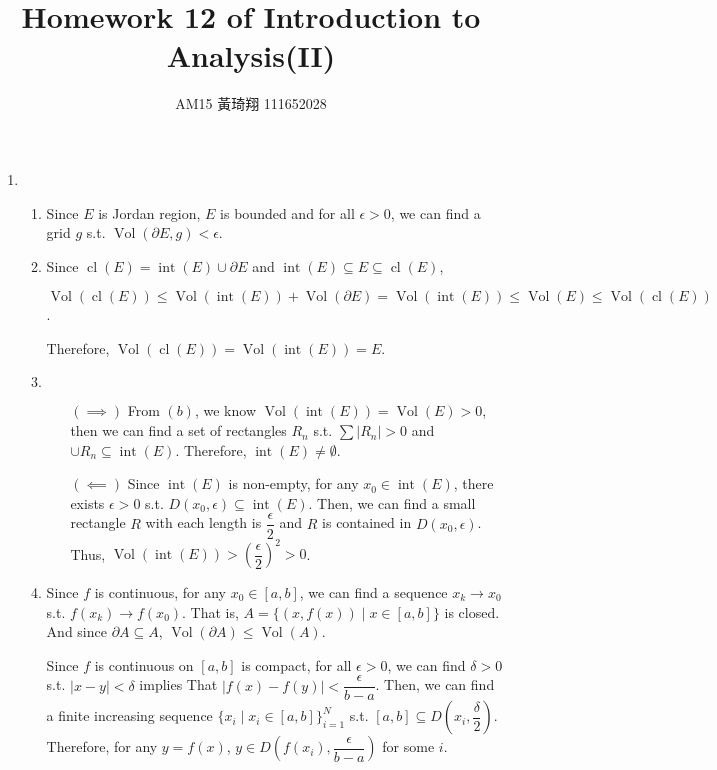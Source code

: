 \documentclass[12pt]{article}
\title{Homework 12 of Introduction to Analysis(II)}
\author{AM15 黃琦翔 111652028}
\DeclareMathOperator{\volume}{Vol}
\DeclareMathOperator{\interior}{int}
\DeclareMathOperator{\closure}{cl}
\newcommand{\boundary}{\partial}
\begin{document}
\maketitle
\begin{enumerate}
    \item \begin{enumerate}
        \item Since $E$ is Jordan region, $E$ is bounded and for all $\epsilon > 0$, we can find a grid $g$ s.t. $\volume(\partial E, g) < \epsilon$.
        

        \item Since $\closure(E) = \interior(E) \cup \boundary E$ and $\interior(E)\subseteq E \subseteq \closure(E)$,

        $\volume(\closure(E)) \leq \volume(\interior(E)) + \volume(\boundary E) = \volume(\interior(E))\leq \volume(E) \leq \volume(\closure(E))$.

        Therefore, $\volume(\closure(E)) = \volume(\interior(E)) = E$.

        \item $\ $
        \begin{enumerate}
            \item[$(\implies)$] From $(b)$, we know $\volume(\interior(E)) = \volume(E) > 0$, 
            then we can find a set of rectangles $R_n$ s.t. $\sum |R_n| > 0$ and $\cup R_n \subseteq \interior(E)$.
            Therefore, $\interior(E) \neq \emptyset$.

            \item[$(\impliedby)$] Since $\interior(E)$ is non-empty, for any $x_0\in \interior(E)$, there exists $\epsilon > 0$ s.t. $D(x_0, \epsilon) \subseteq \interior(E)$.
            Then, we can find a small rectangle $R$ with each length is $\dfrac{\epsilon}{2}$ and $R$ is contained in $D(x_0, \epsilon)$.
            Thus, $\volume(\interior(E)) > \left(\dfrac{\epsilon}{2}\right)^2 > 0$.
        \end{enumerate}

        \item Since $f$ is continuous, for any $x_0 \in [a, b]$, we can find a sequence $x_k \to x_0$ s.t. $f(x_k) \to f(x_0)$.
        That is, $A = \{(x, f(x)) \mid x\in [a, b]\}$ is closed.
        And since $\boundary A \subseteq A$, $\volume(\boundary A) \leq \volume(A)$.
        
        Since $f$ is continuous on $[a, b]$ is compact, for all $\epsilon > 0$, we can find $\delta > 0$ s.t. $|x-y| < \delta$ implies That $|f(x) - f(y)| < \dfrac{\epsilon}{b-a}$.
        Then, we can find a finite increasing sequence $\{x_i \mid x_i \in [a, b]\}_{i=1}^N$ s.t. $[a, b] \subseteq D(x_i, \dfrac{\delta}{2})$.
        Therefore, for any $y = f(x)$, $y \in D(f(x_i), \dfrac{\epsilon}{b-a})$ for some $i$.


\end{enumerate}
\end{enumerate}
\end{document}
